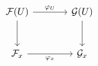\[
\begin{tikzcd}[column sep=large,row sep=large]
\mathcal F(U) \arrow[r,"\varphi_U"] \arrow[d] & \mathcal G(U) \arrow[d] \\
\mathcal F_x \arrow[r,"\varphi_x"'] & \mathcal G_x
\end{tikzcd}
\]
